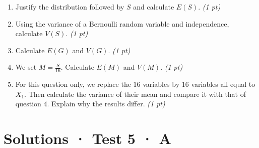 \begin{enumerate}

\item Justify the distribution followed by $S$ and calculate $E(S)$. \hfill\textit{(1 pt)}

\item Using the variance of a Bernoulli random variable and independence, calculate $V(S)$. \hfill\textit{(1 pt)}

\item Calculate $E(G)$ and $V(G)$. \hfill\textit{(1 pt)}

\item We set $M=\frac S{16}$. Calculate $E(M)$ and $V(M)$. \hfill\textit{(1 pt)}

\item For this question only, we replace the $16$ variables by $16$ variables all equal to $X_1$. Then calculate the variance of their mean and compare it with that of question 4. Explain why the results differ. \hfill\textit{(1 pt)}

\end{enumerate}

\ifmxteacher\mxnewpage

\section*{Solutions · Test 5 · A}\label{cor:7-3}

